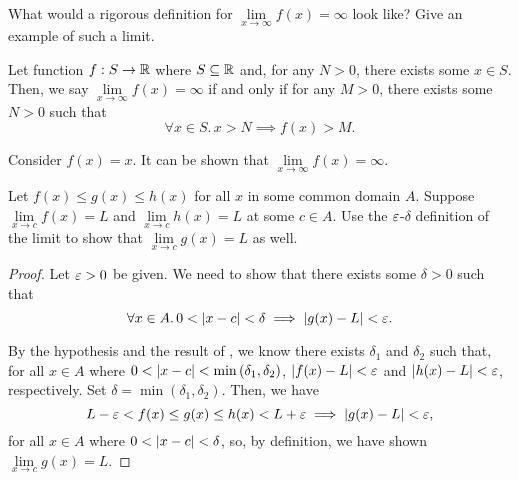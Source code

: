\begin{problem}
  What would a rigorous definition for 
  $\lim\limits_{x \to \infty} f(x) = \infty$ look like? 
  Give an example of such a limit.

  \begin{definition}
    \label{def:limit-to-infty-x-to-infinite}
    Let function $f : S \to \mathbb{R}$ where $S \subseteq \mathbb{R}$ and, for any $N > 0$, there 
    exists some $x \in S$.
    Then, we say $\lim\limits_{x \to \infty} f(x) = \infty$ if and only if for any
    $M > 0$, there exists some $N > 0$ such that
    \[
      \forall x \in S.\, x > N \implies f(x) > M.
    \]
  \end{definition}

  Consider $f(x) = x$. It can be shown that $\lim\limits_{x \to \infty} f(x) = \infty$.

\end{problem}

\begin{problem}
  \label{prob:squeeze-theorem}
  Let $f(x) \leq g(x) \leq h(x)$ for all $x$ in some common domain $A$. Suppose $\lim\limits_{x \to c} f(x) = L$ and
  $\lim\limits_{x \to c} h(x) = L$ at some $c \in A$. Use the $\varepsilon$-$\delta$  definition of the limit
  to show  that $\lim\limits_{x \to c} g(x) = L$ as well.

  \begin{proof}
    Let $\varepsilon > 0$ be given. We need to show that there exists some $\delta > 0$ such that
    \[
      \forall x \in A.\, 0 < \left\lvert x - c \right\rvert < \delta \implies \left\lvert g(x) - L \right\rvert < \varepsilon.
    \]

    By the hypothesis and the result of , we know there exists
    $\delta_{1}$ and $\delta_{2}$ such that, for all $x \in A$ where $0 < \left\lvert x - c \right\rvert < \min{(\delta_{1}, \delta_{2})}$,
    $\left\lvert f(x) - L \right\rvert < \varepsilon$ and $\left\lvert h(x) - L \right\rvert < \varepsilon$, respectively. Set $\delta = \min{(\delta_{1}, \delta_{2})}$. 
    Then, we have
    \[
      L - \varepsilon < f(x) \leq g(x) \leq h(x) < L + \varepsilon \implies \left\lvert g(x) - L \right\rvert < \varepsilon,
    \]
    for all $x \in A$ where $0 < \left\lvert x - c \right\rvert < \delta$, so, by definition, we have 
    shown $\lim\limits_{x \to c} g(x) = L$.
  \end{proof}
  
\end{problem}
